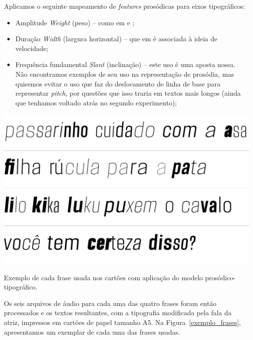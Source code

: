\documentclass[a4paper]{tufte-handout}
\begin{document}
Aplicamos o seguinte mapeamento de \textit{features} prosódicas para eixos tipográficos:

\begin{itemize}
    \item Amplitude \enskip \textrightarrow \enskip \textit{Weight} (peso) -- como em \citet{wolfel2015} e \citet{bessemans2017};
    
    \item Duração \enskip \textrightarrow \enskip \textit{Width} (largura horizontal) -- que em \citet{van2006towards} é associada à ideia de velocidade;
    
    \item Frequência fundamental \enskip \textrightarrow \enskip \textit{Slant} (inclinação) -- este uso é uma aposta nossa. Não encontramos exemplos de seu uso na representação de prosódia, mas quisemos evitar o uso que \citet{bessemans2017} faz do deslocamento de linha de base para representar \textit{pitch}, por questões que isso traria em textos mais longos (ainda que tenhamos voltado atrás no segundo experimento);
\end{itemize}

\begin{marginfigure}[0.05\baselineskip]
  \includegraphics{imgs/exemplos-frases-2.png}
  \caption{Exemplo de cada frase usada nos cartões com aplicação do modelo prosódico-tipográfico.}
  \label{exemplo_frases}
\end{marginfigure}

Os seis arquivos de áudio para cada uma das quatro frases foram então processados e os textos resultantes, com a tipografia modificada pela fala da atriz, impressos em cartões de papel tamanho A5. Na Figura~\ref{exemplo_frases}, apresentamos um exemplar de cada uma das frases usadas. 
\end{document}
